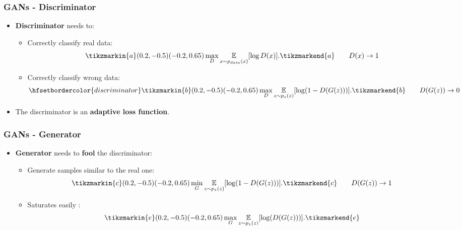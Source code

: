 \documentclass{beamer}
\begin{document}
\begin{frame}
	\frametitle{GANs - Discriminator}
	\begin{itemize}
			\item \textbf{Discriminator} needs to:
			\begin{itemize}
				\item Correctly classify \textcolor{real}{real} data: \\ 
					\begin{equation}
						\tikzmarkin{a}(0.2,-0.5)(-0.2,0.65)
							\max_D \underset{x \sim p_{data}(x)}{\mathbb{E}} [\log D(x)].
						\tikzmarkend{a}
						\tag*{$D(x) \rightarrow 1$}
					\end{equation}
				\item Correctly classify \textcolor{generated}{wrong} data: \\ 
					 \begin{equation}
						\hfsetbordercolor{discriminator} \tikzmarkin{b}(0.2,-0.5)(-0.2,0.65)
							\max_D  \underset{z \sim p_z(z)}{\mathbb{E}}[\log(1 - D(G(z)))].
						\tikzmarkend{b}
						\tag*{$D(G(z)) \rightarrow 0$}
					 \end{equation}
		\end{itemize}
	\item The discriminator is an \textbf{adaptive loss function}.
	\end{itemize}
\end{frame}

\begin{frame}
	\frametitle{GANs - Generator}
	\begin{itemize}
		\item \textbf{Generator} needs to \textbf{fool} the discriminator:
		\begin{itemize}	
			\item<1-> \alert<+>{Generate samples similar to the real one:
			\begin{equation}
				\tikzmarkin{c}(0.2,-0.5)(-0.2,0.65)
				\min_G  \underset{z \sim p_z(z)}{\mathbb{E}}[\log(1 - D(G(z)))].
				\tikzmarkend{c}
				\tag*{$D(G(z)) \rightarrow 1$}
			\end{equation}}
				\item<2-> \alert<+>{Saturates easily \citep{goodfellowGenerativeAdversarialNetworks2014}:
					\begin{equation}
					\tikzmarkin{e}(0.2,-0.5)(-0.2,0.65)
					\max_G  \underset{z \sim p_z(z)}{\mathbb{E}}[\log( D(G(z)))].
					\tikzmarkend{e}
				\end{equation}
				}
		\end{itemize}
	\end{itemize}
\end{frame}
\end{document}
